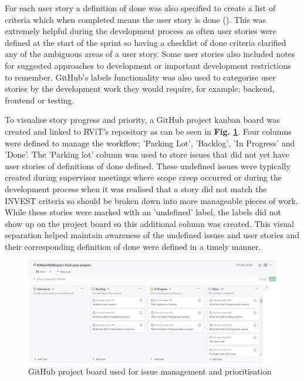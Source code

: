 \documentclass[l4proj.tex]{subfiles}
\begin{document}
For each user story a definition of done was also specified to create a list of criteria which when completed means the user story is done (\cite{Silva2017}). This was extremely helpful during the development process as often user stories were defined at the start of the sprint so having a checklist of done criteria clarified any of the ambiguous areas of a user story. Some user stories also included notes for suggested approaches to development or important development restrictions to remember. GitHub's labels functionality was also used to categorise user stories by the development work they would require, for example; backend, frontend or testing. 

To visualise story progress and priority, a GitHub project kanban board was created and linked to RViT's repository as can be seen in \textbf{Fig. \ref{fig:My Github issue board}}. Four columns were defined to manage the workflow; 'Parking Lot', 'Backlog', 'In Progress' and 'Done'. The 'Parking lot' column was used to store issues that did not yet have user stories of definitions of done defined. These undefined issues were typically created during supervisor meetings where scope creep occurred or during the development process when it was realised that a story did not match the INVEST criteria so should be broken down into more manageable pieces of work. While these stories were marked with an 'undefined' label, the labels did not show up on the project board so this additional column was created. This visual separation helped maintain awareness of the undefined issues and user stories and their corresponding definition of done were defined in a timely manner.

\begin{figure}[h!]
\begin{center}
\includegraphics[scale=0.4]{dissertation/images/ImplementationIssueBoard.png}
\caption{GitHub project board used for issue management and prioritisation}
\label{fig:My Github issue board} 
\end{center}
\end{figure}
\end{document}
